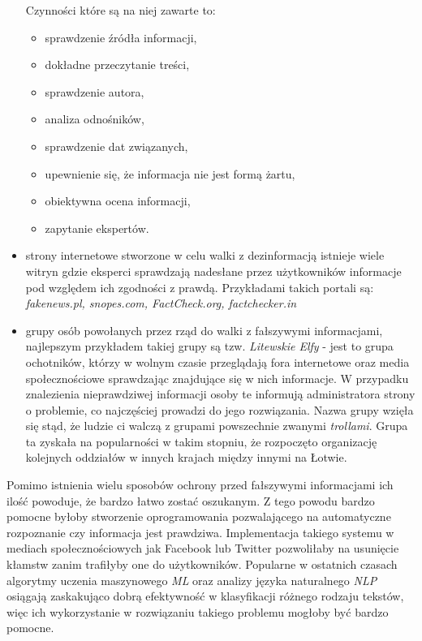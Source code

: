 \begin{itemize}
    Czynności które są na niej zawarte to: 
    \begin{itemize}
        \item sprawdzenie źródła informacji,
        \item dokładne przeczytanie treści,
        \item sprawdzenie autora,
        \item analiza odnośników,
        \item sprawdzenie dat związanych,
        \item upewnienie się, że informacja nie jest formą żartu,
        \item obiektywna ocena informacji,
        \item zapytanie ekspertów.
    \end{itemize}
    \item strony internetowe stworzone w celu walki z dezinformacją istnieje
    wiele witryn gdzie eksperci sprawdzają nadesłane przez użytkowników informacje
    pod względem ich zgodności z prawdą.
    Przykładami takich portali są: \emph{fakenews.pl, snopes.com, FactCheck.org, factchecker.in} 
    \item grupy osób powołanych przez rząd do walki z fałszywymi informacjami, najlepszym przykładem
    takiej grupy są tzw. \emph{Litewskie Elfy} - jest to grupa ochotników, którzy w wolnym czasie przeglądają 
    fora internetowe oraz media społecznościowe sprawdzając znajdujące się w nich informacje. W przypadku
    znalezienia nieprawdziwej informacji osoby te informują administratora strony o problemie, co najczęściej
    prowadzi do jego rozwiązania. Nazwa grupy wzięła się stąd, że ludzie ci walczą z 
    grupami powszechnie zwanymi \emph{trollami}. Grupa ta zyskała na popularności
    w takim stopniu, że rozpoczęto organizację kolejnych oddziałów w innych krajach
    między innymi na Łotwie.~\cite{Elves}
\end{itemize}
Pomimo istnienia wielu sposobów ochrony przed fałszywymi informacjami ich ilość powoduje,
że bardzo łatwo zostać oszukanym. Z tego powodu bardzo pomocne byłoby stworzenie oprogramowania
pozwalającego na automatyczne rozpoznanie czy informacja jest prawdziwa.
Implementacja takiego systemu w mediach społecznościowych jak Facebook lub Twitter pozwoliłaby na usunięcie 
kłamstw zanim trafiłyby one do użytkowników. Popularne w ostatnich czasach algorytmy uczenia
maszynowego \emph{ML} oraz analizy języka naturalnego \emph{NLP} osiągają zaskakująco dobrą 
efektywność w klasyfikacji różnego rodzaju tekstów, więc ich wykorzystanie w rozwiązaniu takiego 
problemu mogłoby być bardzo pomocne.

